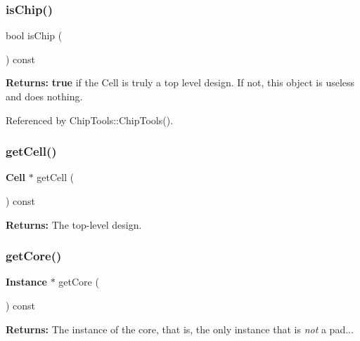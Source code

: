 \subsubsection{\texorpdfstring{is\+Chip()}{isChip()}}
{\footnotesize\ttfamily bool is\+Chip (\begin{DoxyParamCaption}{ }\end{DoxyParamCaption}) const\hspace{0.3cm}{\ttfamily [inline]}}

{\bfseries Returns\+:} {\bfseries true} if the Cell is truly a top level design. If not, this object is useless and does nothing. 

Referenced by Chip\+Tools\+::\+Chip\+Tools().

\mbox{\label{classKatabatic_1_1ChipTools_a55a3a88610ef1af9931e634f77f2403b}} 
\subsubsection{\texorpdfstring{get\+Cell()}{getCell()}}
{\footnotesize\ttfamily \textbf{ Cell} $\ast$ get\+Cell (\begin{DoxyParamCaption}{ }\end{DoxyParamCaption}) const\hspace{0.3cm}{\ttfamily [inline]}}

{\bfseries Returns\+:} The top-\/level design. \mbox{\label{classKatabatic_1_1ChipTools_a8be5c4aecbe9b97ed2eb9557b046b091}} 
\subsubsection{\texorpdfstring{get\+Core()}{getCore()}}
{\footnotesize\ttfamily \textbf{ Instance} $\ast$ get\+Core (\begin{DoxyParamCaption}{ }\end{DoxyParamCaption}) const\hspace{0.3cm}{\ttfamily [inline]}}

{\bfseries Returns\+:} The instance of the core, that is, the only instance that is {\itshape not} a pad... \mbox{\label{classKatabatic_1_1ChipTools_ada9182cc0bcdb47b156a29cf42d08651}} 

